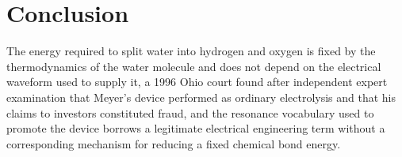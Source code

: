 \documentclass[11pt]{article}
\begin{document}
\section{Conclusion}

The energy required to split water into hydrogen and oxygen is fixed by the thermodynamics of the water molecule and does not depend on the electrical waveform used to supply it, a 1996 Ohio court found after independent expert examination that Meyer's device performed as ordinary electrolysis and that his claims to investors constituted fraud, and the resonance vocabulary used to promote the device borrows a legitimate electrical engineering term without a corresponding mechanism for reducing a fixed chemical bond energy.
\end{document}
